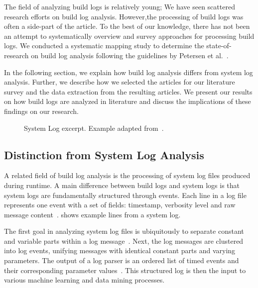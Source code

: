 The field of analyzing build
logs is relatively young; We have seen scattered
research efforts on build log analysis.
However,the processing of build logs was often
a side-part of the article.
To the best of our
knowledge, there has not been an attempt to systematically overview
and survey approaches for processing build logs.
We conducted a systematic mapping study to determine the
state-of-research on build log analysis following the guidelines
by Petersen et al.~\cite{petersen2008systematic,petersen2015guidelines}.

In the following section, we explain how build log analysis differs
from system log analysis.
Further, we describe how we selected the articles for our literature
survey and the data extraction from the resulting articles.
We present our results on how build logs are analyzed in literature
and discuss the implications of these findings on our research.

\begin{figure}[htbp]
  \centering
  
  \caption{System Log excerpt.
Example adapted from~\cite{he2017towards}.}
  \label{lst:system-log}
\end{figure}


\subsection{Distinction from System Log Analysis}
\label{sec:system-log-analysis}
A related field of build log analysis is the processing of system log
files produced during runtime.
A main difference between build logs
and system logs is that system logs are fundamentally structured
through events.
Each line in a log file represents one event with a
set of fields: timestamp, verbosity level and raw message
content~\cite{he2017towards}.
 shows
example lines from a system log.

The first goal in analyzing system log files is ubiquitously to
separate constant and variable parts within a log
message~\cite{nagappan2010abstracting,he2017towards}.
Next, the log
messages are clustered into log events, unifying messages with
identical constant parts and varying parameters.
The output of a log
parser is an ordered list of timed events and their corresponding
parameter values~\cite{he2016evaluation}.
This structured log is then
the input to various machine learning and data mining processes.

